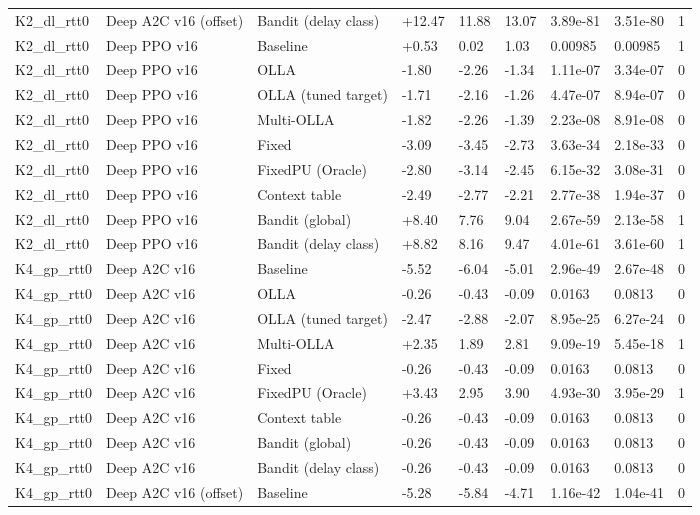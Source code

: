 \documentclass[10pt]{article}
\begin{document}
\begin{landscape}
\begin{longtable}{@{}lllllllll@{}}
K2\_dl\_rtt0 & Deep A2C v16 (offset) & Bandit (delay class) & +12.47 & 11.88 & 13.07 & 3.89e-81 & 3.51e-80 & 1 \\
K2\_dl\_rtt0 & Deep PPO v16 & Baseline & +0.53 & 0.02 & 1.03 & 0.00985 & 0.00985 & 1 \\
K2\_dl\_rtt0 & Deep PPO v16 & OLLA & -1.80 & -2.26 & -1.34 & 1.11e-07 & 3.34e-07 & 0 \\
K2\_dl\_rtt0 & Deep PPO v16 & OLLA (tuned target) & -1.71 & -2.16 & -1.26 & 4.47e-07 & 8.94e-07 & 0 \\
K2\_dl\_rtt0 & Deep PPO v16 & Multi-OLLA & -1.82 & -2.26 & -1.39 & 2.23e-08 & 8.91e-08 & 0 \\
K2\_dl\_rtt0 & Deep PPO v16 & Fixed & -3.09 & -3.45 & -2.73 & 3.63e-34 & 2.18e-33 & 0 \\
K2\_dl\_rtt0 & Deep PPO v16 & FixedPU (Oracle) & -2.80 & -3.14 & -2.45 & 6.15e-32 & 3.08e-31 & 0 \\
K2\_dl\_rtt0 & Deep PPO v16 & Context table & -2.49 & -2.77 & -2.21 & 2.77e-38 & 1.94e-37 & 0 \\
K2\_dl\_rtt0 & Deep PPO v16 & Bandit (global) & +8.40 & 7.76 & 9.04 & 2.67e-59 & 2.13e-58 & 1 \\
K2\_dl\_rtt0 & Deep PPO v16 & Bandit (delay class) & +8.82 & 8.16 & 9.47 & 4.01e-61 & 3.61e-60 & 1 \\
K4\_gp\_rtt0 & Deep A2C v16 & Baseline & -5.52 & -6.04 & -5.01 & 2.96e-49 & 2.67e-48 & 0 \\
K4\_gp\_rtt0 & Deep A2C v16 & OLLA & -0.26 & -0.43 & -0.09 & 0.0163 & 0.0813 & 0 \\
K4\_gp\_rtt0 & Deep A2C v16 & OLLA (tuned target) & -2.47 & -2.88 & -2.07 & 8.95e-25 & 6.27e-24 & 0 \\
K4\_gp\_rtt0 & Deep A2C v16 & Multi-OLLA & +2.35 & 1.89 & 2.81 & 9.09e-19 & 5.45e-18 & 1 \\
K4\_gp\_rtt0 & Deep A2C v16 & Fixed & -0.26 & -0.43 & -0.09 & 0.0163 & 0.0813 & 0 \\
K4\_gp\_rtt0 & Deep A2C v16 & FixedPU (Oracle) & +3.43 & 2.95 & 3.90 & 4.93e-30 & 3.95e-29 & 1 \\
K4\_gp\_rtt0 & Deep A2C v16 & Context table & -0.26 & -0.43 & -0.09 & 0.0163 & 0.0813 & 0 \\
K4\_gp\_rtt0 & Deep A2C v16 & Bandit (global) & -0.26 & -0.43 & -0.09 & 0.0163 & 0.0813 & 0 \\
K4\_gp\_rtt0 & Deep A2C v16 & Bandit (delay class) & -0.26 & -0.43 & -0.09 & 0.0163 & 0.0813 & 0 \\
K4\_gp\_rtt0 & Deep A2C v16 (offset) & Baseline & -5.28 & -5.84 & -4.71 & 1.16e-42 & 1.04e-41 & 0 \\

\end{longtable}
\end{landscape}
\end{document}
